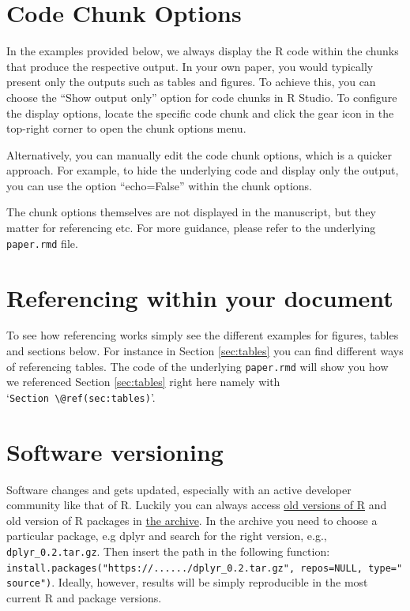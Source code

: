 \documentclass[
  12pt,
]{article}
\begin{document}
\hypertarget{code-chunk-options}{%
\section{Code Chunk Options}\label{code-chunk-options}}

In the examples provided below, we always display the R code within the chunks that produce the respective output. In your own paper, you would typically present only the outputs such as tables and figures. To achieve this, you can choose the ``Show output only'' option for code chunks in R Studio. To configure the display options, locate the specific code chunk and click the gear icon in the top-right corner to open the chunk options menu.

Alternatively, you can manually edit the code chunk options, which is a quicker approach. For example, to hide the underlying code and display only the output, you can use the option ``echo=False'' within the chunk options.

The chunk options themselves are not displayed in the manuscript, but they matter for referencing etc. For more guidance, please refer to the underlying \texttt{paper.rmd} file.

\hypertarget{referencing-within-your-document}{%
\section{Referencing within your document}\label{referencing-within-your-document}}

To see how referencing works simply see the different examples for figures, tables and sections below. For instance in Section \ref{sec:tables} you can find different ways of referencing tables. The code of the underlying \texttt{paper.rmd} will show you how we referenced Section \ref{sec:tables} right here namely with `\texttt{Section\ \textbackslash{}@ref(sec:tables)}'.

\hypertarget{software-versioning}{%
\section{Software versioning}\label{software-versioning}}

Software changes and gets updated, especially with an active developer community like that of R. Luckily you can always access \href{https://cran.r-project.org/bin/windows/base/old/}{old versions of R} and old version of R packages in \href{https://cran.r-project.org/src/contrib/Archive/}{the archive}. In the archive you need to choose a particular package, e.g dplyr and search for the right version, e.g., \texttt{dplyr\_0.2.tar.gz}. Then insert the path in the following function: \texttt{install.packages("https://....../dplyr\_0.2.tar.gz",\ repos=NULL,\ type="source")}. Ideally, however, results will be simply reproducible in the most current R and package versions.
\end{document}
